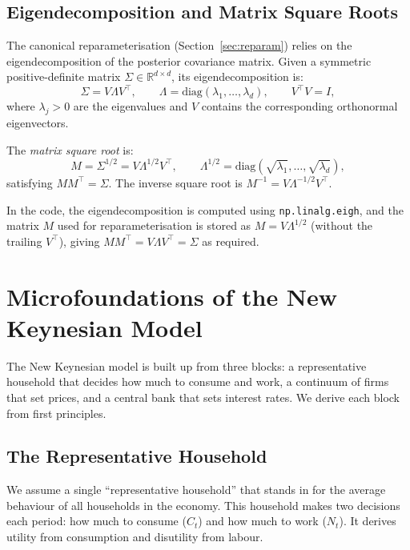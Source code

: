 \documentclass[11pt,a4paper]{article}
\theoremstyle{definition}
\newcommand{\R}{\mathbb{R}}
\newcommand{\diag}{\mathrm{diag}}
\newcommand{\code}[1]{\texttt{\color{codecolor}#1}}
\begin{document}
	\subsection{Eigendecomposition and Matrix Square Roots}
	\label{sec:eigen_sqrt}
	
	The canonical reparameterisation (Section~\ref{sec:reparam}) relies on the eigendecomposition of the posterior covariance matrix.
	Given a symmetric positive-definite matrix $\Sigma \in \R^{d \times d}$, its eigendecomposition is:
	\begin{equation}
		\Sigma = V \Lambda V^\top, \qquad \Lambda = \diag(\lambda_1, \ldots, \lambda_d), \qquad V^\top V = I,
	\end{equation}
	where $\lambda_j > 0$ are the eigenvalues and $V$ contains the corresponding orthonormal eigenvectors.
	
	The \emph{matrix square root} is:
	\begin{equation}\label{eq:matrix_sqrt}
		M = \Sigma^{1/2} = V \Lambda^{1/2} V^\top, \qquad \Lambda^{1/2} = \diag(\sqrt{\lambda_1}, \ldots, \sqrt{\lambda_d}),
	\end{equation}
	satisfying $M M^\top = \Sigma$.  The inverse square root is $M^{-1} = V \Lambda^{-1/2} V^\top$.
	
	In the code, the eigendecomposition is computed using \code{np.linalg.eigh}, and the matrix $M$ used for reparameterisation is stored as $M = V \Lambda^{1/2}$ (without the trailing $V^\top$), giving $M M^\top = V \Lambda V^\top = \Sigma$ as required.
	
	
	\section{Microfoundations of the New Keynesian Model}
	\label{sec:micro}
	
	The New Keynesian model is built up from three blocks: a representative household that decides how much to consume and work, a continuum of firms that set prices, and a central bank that sets interest rates.
	We derive each block from first principles.
	
	\subsection{The Representative Household}
	\label{sec:household}
	
	We assume a single ``representative household'' that stands in for the average behaviour of all households in the economy.
	This household makes two decisions each period: how much to consume ($C_t$) and how much to work ($N_t$).
	It derives utility from consumption and disutility from labour.
	
\end{document}
